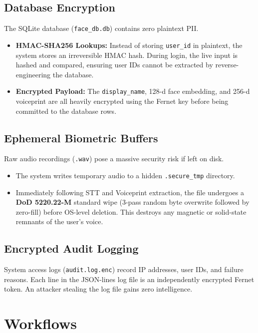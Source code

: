 \documentclass[12pt,a4paper]{article}
\begin{document}
\subsection{Database Encryption}
The SQLite database (\texttt{face\_db.db}) contains zero plaintext PII.
\begin{itemize}
    \item \textbf{HMAC-SHA256 Lookups:} Instead of storing \texttt{user\_id} in plaintext, the system stores an irreversible HMAC hash. During login, the live input is hashed and compared, ensuring user IDs cannot be extracted by reverse-engineering the database.
    \item \textbf{Encrypted Payload:} The \texttt{display\_name}, 128-d face embedding, and 256-d voiceprint are all heavily encrypted using the Fernet key before being committed to the database rows.
\end{itemize}

\subsection{Ephemeral Biometric Buffers}
Raw audio recordings (\texttt{.wav}) pose a massive security risk if left on disk. 
\begin{itemize}
    \item The system writes temporary audio to a hidden \texttt{.secure\_tmp} directory.
    \item Immediately following STT and Voiceprint extraction, the file undergoes a \textbf{DoD 5220.22-M} standard wipe (3-pass random byte overwrite followed by zero-fill) before OS-level deletion. This destroys any magnetic or solid-state remnants of the user's voice.
\end{itemize}

\subsection{Encrypted Audit Logging}
System access logs (\texttt{audit.log.enc}) record IP addresses, user IDs, and failure reasons. Each line in the JSON-lines log file is an independently encrypted Fernet token. An attacker stealing the log file gains zero intelligence.

\section{Workflows}
\end{document}
